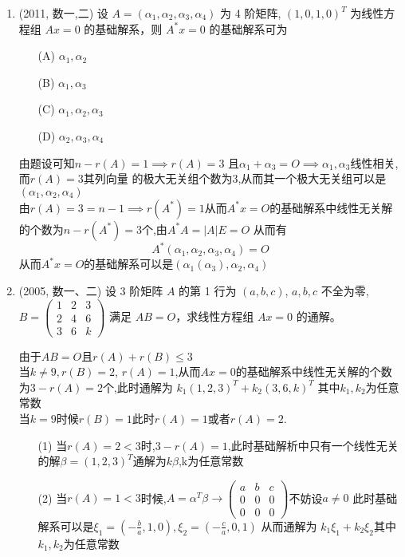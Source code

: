 \documentclass[12pt, a4paper, oneside, UTF8]{ctexbook}
\begin{document}
\begin{enumerate}
    \item (2011, 数一,二) 设 $A = (\alpha_1, \alpha_2, \alpha_3, \alpha_4)$ 为 4 阶矩阵, $(1,0,1,0)^T$ 为线性方程组 $Ax = 0$ 的基础解系，则 $A^* x = 0$ 的基础解系可为
    \begin{enumerate}
        \item [(A)] $\alpha_1, \alpha_2$
        \item [(B)] $\alpha_1, \alpha_3$
        \item [(C)] $\alpha_1, \alpha_2, \alpha_3$
        \item [(D)] $\alpha_2, \alpha_3, \alpha_4$
    \end{enumerate}
    
    \begin{solution}
    由题设可知$n-r(A)=1\implies r(A)=3$ 且$\alpha_1+\alpha_3=O\implies \alpha_1,\alpha_3$线性相关,而$r(A)=3$其列向量
    的极大无关组个数为3,从而其一个极大无关组可以是$(\alpha_1,\alpha_2,\alpha_4)$ \\
    由$r(A)=3=n-1\implies r(A^*)=1$从而$A^*x=O$的基础解系中线性无关解的个数为$n-r(A^*)=3$个,由$A^*A=\left|A\right|E=O$ 
    从而有
    $$
    A^*(\alpha_1,\alpha_2,\alpha_3,\alpha_4)=O
    $$
    从而$A^*x=O$的基础解系可以是$(\alpha_1(\alpha_3),\alpha_2,\alpha_4)$
    \end{solution}
    
    \item (2005, 数一、二) 设 3 阶矩阵 $A$ 的第 1 行为 $(a, b, c)$, $a, b, c$ 不全为零, 
    $B = \begin{pmatrix} 1 & 2 &3 \\ 2 & 4 & 6 \\ 3 & 6 & k \end{pmatrix}$ 满足 $AB = O$，求线性方程组 $Ax = 0$ 的通解。
    
    \begin{solution}
    由于$AB=O$且$r(A)+r(B)\leq 3$ \\
    当$k\neq 9,r(B)=2$, $r(A)=1$,从而$Ax=0$的基础解系中线性无关解的个数为$3-r(A)=2$个,此时通解为 
    $k_1(1,2,3)^T+k_2(3,6,k)^T$ 其中$k_1,k_2$为任意常数 \\
    当$k=9$时候$r(B)=1$此时$r(A)=1\text{或者}r(A)=2$.  
    \begin{enumerate}
        \item [(1)] 当$r(A)=2<3$时,$3-r(A)=1$,此时基础解析中只有一个线性无关的解$\beta=(1,2,3)^T$通解为$k\beta$,k为任意常数 
        \item [(2)] 当$r(A)=1<3$时候,$A=\alpha^T\beta \rightarrow \begin{pmatrix}
            a & b & c \\
            0 & 0 & 0 \\
            0 & 0 & 0
        \end{pmatrix}$不妨设$a\neq 0$ 此时基础解系可以是$\xi_1=(-\frac{b}{a},1,0),\xi_2=(-\frac{c}{a},0,1)$ 从而通解为
        $k_1\xi_1+k_2\xi_2$其中$k_1,k_2$为任意常数 
    \end{enumerate}
    \end{solution}
    

\end{enumerate}
\end{document}
